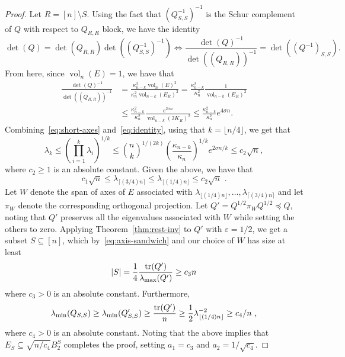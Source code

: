 \documentclass[11pt]{article}
\newcommand{\ceil}[1]{\lceil #1 \rceil}
\newcommand{\floor}[1]{\lfloor #1 \rfloor}
\newcommand\eps{\varepsilon}
\DeclareMathOperator{\vol}{vol}
\DeclareMathOperator{\tr}{tr}
\begin{document}
\begin{proof}
Let $R = [n] \setminus S$. Using the fact that $(Q^{-1}_{S,S})^{-1}$ is the
Schur complement of $Q$ with respect to $Q_{R,R}$ block, we have the identity 
\begin{equation}
\det(Q) = \det(Q_{R,R}) \det((Q^{-1}_{S,S})^{-1}) \Leftrightarrow
\frac{\det(Q)^{-1}}{\det((Q_{R,R}))^{-1}} = \det((Q^{-1})_{S,S}) .
\end{equation}
From here, since $\vol_n(E)=1$, we have that
\begin{equation}
\label{eq:identity}
\begin{split}
\frac{\det(Q)^{-1}}{\det((Q_{R,R}))^{-1}} &= \frac{\kappa^2_{n-k}
\vol_n(E)^2}{\kappa^2_n \vol_{n-k}(E_R)^2} = \frac{\kappa^2_{n-k}}{\kappa_n^2}
\frac{1}{\vol_{n-k}(E_R)^2} \\
&\leq \frac{\kappa^2_{n-k}}{\kappa_n^2} \frac{e^{2\sigma n}}{\vol_{n-k}(2K_R)^2}
\leq \frac{\kappa^2_{n-k}}{\kappa_n^2} e^{4\sigma n}.
\end{split}
\end{equation}
Combining~\eqref{eq:short-axes} and~\eqref{eq:identity}, using that $k =
\floor{n/4}$, we get that
\begin{equation}
\label{eq:axes-short}
\lambda_k \leq (\prod_{i=1}^k \lambda_i)^{1/k} \leq \binom{n}{k}^{1/(2k)}
(\frac{\kappa_{n-k}}{\kappa_n})^{1/k} e^{2\sigma n/k} \leq c_2 \sqrt{n},
\end{equation}
where $c_2 \geq 1$ is an absolute constant. Given the above, we have that
\begin{equation}
\label{eq:axis-sandwich}
c_1 \sqrt{n} \leq \lambda_{\ceil{(3/4)n}} \leq \lambda_{\floor{(1/4)n}} \leq c_2
\sqrt{n} \text{ .}
\end{equation}
Let $W$ denote the span of axes of $E$ associated with
$\lambda_{\floor{(1/4)n}},\dots,\lambda_{\ceil{(3/4)n}}$ and let $\pi_W$ denote
the corresponding orthogonal projection. Let $Q' = Q^{1/2}\pi_WQ^{1/2} \preceq
Q$, noting that $Q'$ preserves all the eigenvalues associated with $W$ while
setting the others to zero. Applying Theorem~\ref{thm:rest-inv} to $Q'$ with
$\eps=1/2$, we get a subset $S \subseteq [n]$, which by~\eqref{eq:axis-sandwich}
and our choice of $W$ has size at least
\[
|S| = \frac{1}{4} \frac{\tr(Q')}{\lambda_{\rm max}(Q')} \geq c_3 n
\]  
where $c_3 > 0$ is an absolute constant. Furthermore,
\[
\lambda_{\rm \min}(Q_{S,S}) \geq \lambda_{\rm min}(Q'_{S,S}) \geq
\frac{\tr(Q')}{n} \geq \frac{1}{2} \lambda_{\floor{(1/4)n}}^{-2} \geq c_4/n \text{ ,}
\]
where $c_4 > 0$ is an absolute constant. Noting that the above implies that
$E_S \subseteq \sqrt{n/c_4} B_2^S$ completes the proof, setting $a_1 = c_3$ and
$a_2 = 1/\sqrt{c_4}$.
\end{proof}
\end{document}
